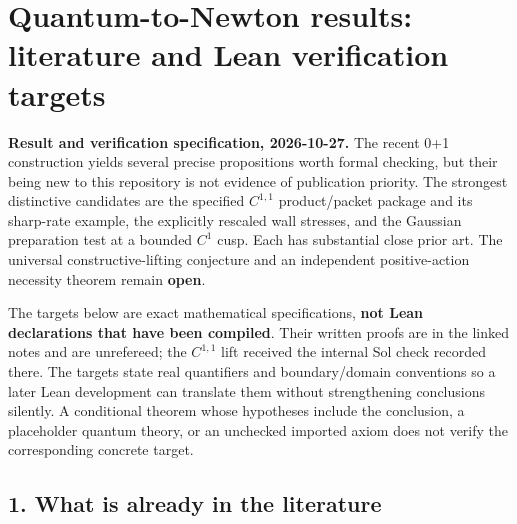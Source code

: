 \documentclass[11pt,a4paper]{article}
\begin{document}
\hypertarget{quantum-to-newton-results-literature-and-lean-verification-targets}{%
\section{Quantum-to-Newton results: literature and Lean verification
targets}\label{quantum-to-newton-results-literature-and-lean-verification-targets}}

\textbf{Result and verification specification, 2026-10-27.} The recent
0+1 construction yields several precise propositions worth formal
checking, but their being new to this repository is not evidence of
publication priority. The strongest distinctive candidates are the
specified \(C^{1,1}\) product/packet package and its sharp-rate example,
the explicitly rescaled wall stresses, and the Gaussian preparation test
at a bounded \(C^1\) cusp. Each has substantial close prior art. The
universal constructive-lifting conjecture and an independent
positive-action necessity theorem remain \textbf{open}.

The targets below are exact mathematical specifications, \textbf{not
Lean declarations that have been compiled}. Their written proofs are in
the linked notes and are unrefereed; the \(C^{1,1}\) lift received the
internal Sol check recorded there. The targets state real quantifiers
and boundary/domain conventions so a later Lean development can
translate them without strengthening conclusions silently. A conditional
theorem whose hypotheses include the conclusion, a placeholder quantum
theory, or an unchecked imported axiom does not verify the corresponding
concrete target.

\hypertarget{what-is-already-in-the-literature}{%
\subsection{1. What is already in the
literature}\label{what-is-already-in-the-literature}}
\end{document}
